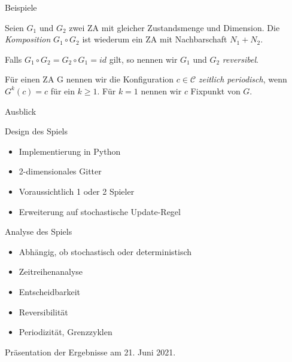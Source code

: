 \documentclass[aspectratio=169]{beamer}
\begin{document}
  \begin{frame}{Beispiele}

    \begin{example*}
      Seien $G_1$ und $G_2$ zwei ZA mit gleicher Zustandsmenge und Dimension. Die \textit{Komposition} $G_1 \circ G_2$ ist wiederum ein ZA mit Nachbarschaft $N_1 + N_2$.

      Falls $G_1 \circ G_2 = G_2 \circ G_1 = id$ gilt, so nennen wir $G_1$ und $G_2$ \textit{reversibel}.
    \end{example*}

    \pause

    \begin{example*}
      Für einen ZA G nennen wir die Konfiguration $c \in \mathcal{C}$ \textit{zeitlich periodisch}, wenn $G^k(c) = c$ für ein $k \geq 1$. Für $k= 1$ nennen wir $c$ Fixpunkt von $G$.
    \end{example*}

  \end{frame}



  \begin{frame}{Ausblick}
    \begin{block}{Design des Spiels}
      \begin{itemize}
        \item Implementierung in Python
        \item 2-dimensionales Gitter
        \item Voraussichtlich 1 oder 2 Spieler
        \item Erweiterung auf stochastische Update-Regel
      \end{itemize}
    \end{block}

    \pause

    \begin{block}{Analyse des Spiels}
      \begin{itemize}
        \item Abhängig, ob stochastisch oder deterministisch
        \item Zeitreihenanalyse
        \item Entscheidbarkeit
        \item Reversibilität
        \item Periodizität, Grenzzyklen
      \end{itemize}

    \end{block}


  \end{frame}



  \begin{frame}{}
    \begin{block}{}

      {
          \centering
          \huge
          Präsentation der Ergebnisse am 21. Juni 2021.
      }

    \end{block}

  \end{frame}
\end{document}
